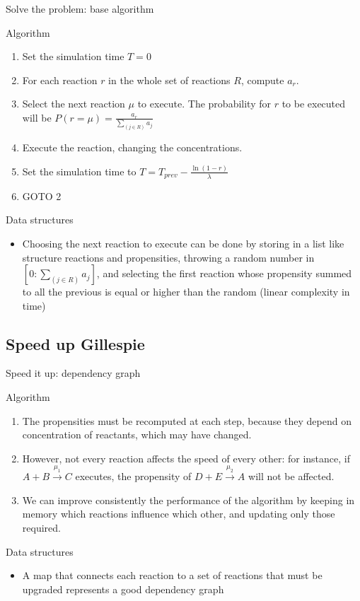 \documentclass[presentation]{beamer}
\begin{document}
\begin{frame}{Solve the problem: base algorithm}
 \begin{block}{Algorithm}
  \begin{enumerate}
   \item Set the simulation time $T = 0$
   \item For each reaction $r$ in the whole set of reactions $R$, compute $a_r$.
   \item Select the next reaction $\mu$ to execute. The probability for $r$ to be executed will be $P(r = \mu) = \frac{a_r}{\sum_{(j\in R)} a_j} $
   \item Execute the reaction, changing the concentrations.
   \item Set the simulation time to $T = T_{prev} - \frac{\ln \left( 1 - r \right)}{\lambda}$
   \item GOTO 2
  \end{enumerate}
 \end{block}
 \begin{block}{Data structures}
  \begin{itemize}
   \item Choosing the next reaction to execute can be done by storing in a list like structure reactions and propensities, throwing a random number in $\left[0: \sum_{(j\in R)} a_j\right]$, and selecting the first reaction whose propensity summed to all the previous is equal or higher than the random (linear complexity in time)
  \end{itemize}
 \end{block}
\end{frame}

\subsection{Speed up Gillespie}
\begin{frame}{Speed it up: dependency graph}
 \begin{block}{Algorithm}
  \begin{enumerate}
   \item The propensities must be recomputed at each step, because they depend on concentration of reactants, which may have changed.
   \item However, not every reaction affects the speed of every other: for instance, if $A + B\xrightarrow{\mu_1} C$ executes, the propensity of $D + E\xrightarrow{\mu_2} A$ will not be affected.
   \item We can improve consistently the performance of the algorithm by keeping in memory which reactions influence which other, and updating only those required.
  \end{enumerate}
 \end{block}
 \begin{block}{Data structures}
  \begin{itemize}
   \item A map that connects each reaction to a set of reactions that must be upgraded represents a good dependency graph
  \end{itemize}
 \end{block}
\end{frame}
\end{document}
